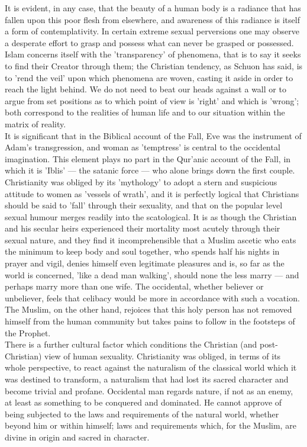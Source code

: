 \documentclass[10pt, twoside]{book}
\begin{document}
It is evident, in any case, that the beauty of a human body is a radiance that has fallen upon this 
poor flesh from elsewhere, and awareness of this radiance is itself a form of contemplativity. In 
certain extreme sexual perversions one may observe a desperate effort to grasp and possess what can 
never be grasped or possessed. Islam concerns itself with the 'transparency' of phenomena, that is to 
say it seeks to find their Creator through them; the Christian tendency, as Schuon has said, is to 
'rend the veil' upon which phenomena are woven, casting it aside in order to reach the light behind. 
We do not need to beat our heads against a wall or to argue from set positions as to which point of 
view is 'right' and which is 'wrong'; both correspond to the realities of human life and to our 
situation within the matrix of reality. \\

It is significant that in the Biblical account of the Fall, Eve was the instrument of Adam's 
transgression, and woman as 'temptress' is central to the occidental imagination. This element plays 
no part in the Qur'anic account of the Fall, in which it is 'Iblis' --- the satanic force --- who alone 
brings down the first couple. Christianity was obliged by its 'mythology' to adopt a stern and 
suspicious attitude to women as 'vessels of wrath', and it is perfectly logical that Christians 
should be said to 'fall' through their sexuality, and that on the popular level sexual humour merges 
readily into the scatological. It is as though the Christian and his secular heirs experienced their 
mortality most acutely through their sexual nature, and they find it incomprehensible that a Muslim 
ascetic who eats the minimum to keep body and soul together, who spends half his nights in prayer and 
vigil, denies himself even legitimate pleasures and is, so far as the world is concerned, 'like a 
dead man walking', should none the less marry --- and perhaps marry more than one wife. The occidental, 
whether believer or unbeliever, feels that celibacy would be more in accordance with such a vocation. 
The Muslim, on the other hand, rejoices that this holy person has not removed himself from the human 
community but takes pains to follow in the footsteps of the Prophet. \\

There is a further cultural factor which conditions the Christian (and post\hyp{}Christian) view of human 
sexuality. Christianity was obliged, in terms of its whole perspective, to react against the 
naturalism of the classical world which it was destined to transform, a naturalism that had lost its 
sacred character and become trivial and profane. Occidental man regards nature, if not as an enemy, 
at least as something to be conquered and dominated. He cannot approve of being subjected to the laws 
and requirements of the natural world, whether beyond him or within himself; laws and requirements 
which, for the Muslim, are divine in origin and sacred in character. \\
\end{document}
